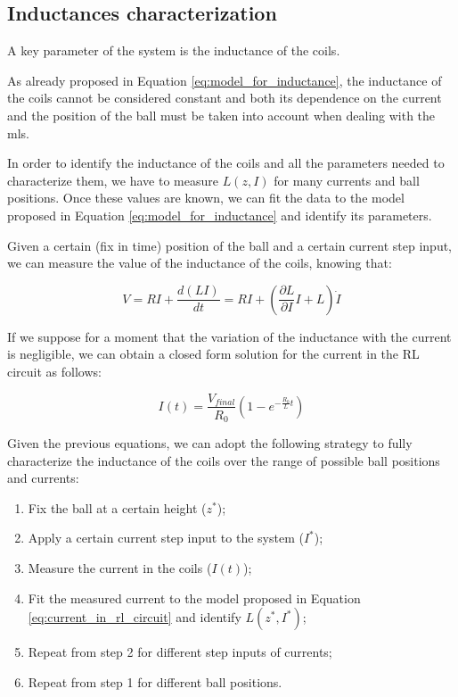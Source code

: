 \subsection{Inductances characterization}
\label{subsec:inductances_characterization}

A key parameter of the system is the inductance of the coils.

As already proposed in Equation \ref{eq:model_for_inductance}, the inductance of the coils cannot be considered constant and both its dependence on the current and the position of the ball must be taken into account when dealing with the \acrshort{mls}.

In order to identify the inductance of the coils and all the parameters needed to characterize them, we have to measure $L(z, I)$ for many currents and ball positions.
Once these values are known, we can fit the data to the model proposed in Equation \ref{eq:model_for_inductance} and identify its parameters.

Given a certain (fix in time) position of the ball and a certain current step input, we can measure the value of the inductance of the coils, knowing that:

\begin{equation}
    V = R I + \frac{d (L I)}{d t} = R I + \left( \frac{\partial L}{\partial I} I + L \right) \dot{I}
    \label{eq:voltage_in_rl_circuit}
\end{equation}

If we suppose for a moment that the variation of the inductance with the current is negligible, we can obtain a closed form solution for the current in the RL circuit as follows:

\begin{equation}
    I(t) = \frac{V_{final}}{R_0} \left( 1 - e^{- \frac{R_0}{L} t} \right)
    \label{eq:current_in_rl_circuit}
\end{equation}

Given the previous equations, we can adopt the following strategy to fully characterize the inductance of the coils over the range of possible ball positions and currents:

\begin{enumerate}
    \item Fix the ball at a certain height ($z^*$);
    \item Apply a certain current step input to the system ($I^*$);
    \item Measure the current in the coils ($I(t)$);
    \item Fit the measured current to the model proposed in Equation \ref{eq:current_in_rl_circuit} and identify $L(z^*, I^*)$;
    \item Repeat from step 2 for different step inputs of currents;
    \item Repeat from step 1 for different ball positions.
\end{enumerate}

